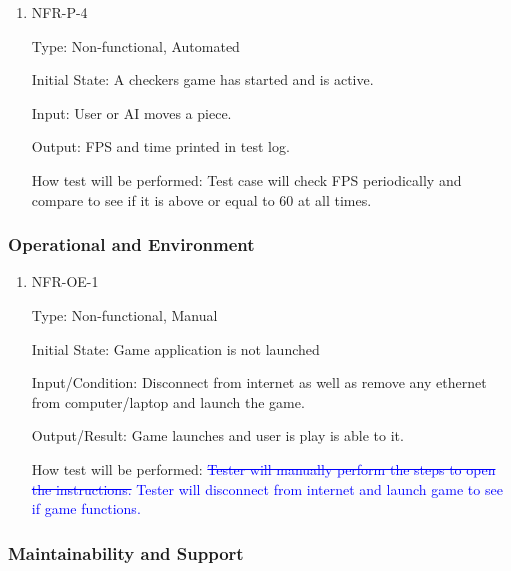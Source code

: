\documentclass[12pt, titlepage]{article}
\begin{document}
\begin{enumerate}
\item{NFR-P-4\\}

Type: Non-functional, Automated
					
Initial State: A checkers game has started and is active.
					
Input: User or AI moves a piece.
					
Output: FPS and time printed in test log.
					
How test will be performed: Test case will check FPS periodically and compare to see if it is above or equal to 60 at all times.

\end{enumerate}

\subsubsection{Operational and Environment}

\begin{enumerate}

\item{NFR-OE-1\\}

Type: Non-functional, Manual
					
Initial State: Game application is not launched 
					
Input/Condition: Disconnect from internet as well as remove any ethernet from computer/laptop and launch the game.
					
Output/Result: Game launches and user is play is able to it.
					
How test will be performed: \textcolor{blue}{\sout{Tester will manually perform the steps to open the instructions.} Tester will disconnect from internet and launch game to see if game functions. }

\end{enumerate}

\subsubsection{Maintainability and Support}
\end{document}
